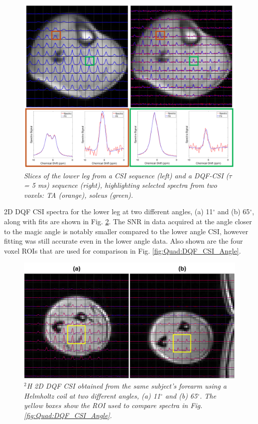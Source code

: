 \begin{figure}
    \centering
    \includegraphics[width=1\textwidth]{Figures/Quad/SQFDQF_CSI_2.png}
    \caption{\textit{Slices of the lower leg from a \ac{CSI} sequence (left) and a \ac{DQF}-\ac{CSI} ($\tau$ = 5 ms) sequence (right), highlighting selected spectra from two voxels: \ac{TA} (orange), soleus (green).}}
    \label{fig:Quad:SQFDQF_2}
\end{figure}

2D \ac{DQF} \ac{CSI} spectra for the lower leg at two different angles, (a) 11$^\circ$ and (b) 65$^\circ$, along with fits are shown in Fig. \ref{fig:Quad:Arm_DQF}. The \ac{SNR} in data acquired at the angle closer to the magic angle is notably smaller compared to the lower angle \ac{CSI}, however fitting was still accurate even in the lower angle data. Also shown are the four voxel \ac{ROI}s that are used for comparison in Fig. \ref{fig:Quad:DQF_CSI_Angle}.

\begin{figure}
    \centering
    \includegraphics[width=1\textwidth]{Figures/Quad/Arm_DQF.png}
    \caption{\textit{$^2$H 2D \ac{DQF} \ac{CSI} obtained from the same subject's forearm using a Helmholtz coil at two different angles, (a) 11$^\circ$ and (b) 65$^\circ$. The yellow boxes show the \ac{ROI} used to compare spectra in Fig. \ref{fig:Quad:DQF_CSI_Angle}}.}
    \label{fig:Quad:Arm_DQF}
\end{figure}

